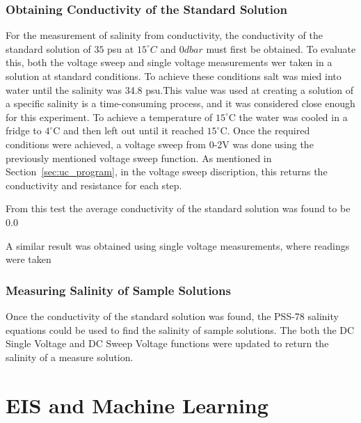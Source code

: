 \subsubsection{Obtaining Conductivity of the Standard Solution}
For the measurement of salinity from conductivity, the conductivity of the standard solution of $35$ \gls{psu} at $15^{\circ}C$ and $0dbar$ must first be obtained.
To evaluate this, both the voltage sweep and single voltage measurements wer taken in a solution at standard conditions.
To achieve these conditions salt was mied into water until the salinity was 34.8 \gls{psu}.This value was used at creating a solution of a specific salinity is a time-consuming process, and it was considered close enough for this experiment.
To achieve a temperature of $15^\circ$C the water was cooled in a fridge to $4^\circ$C and then left out until it reached $15^\circ$C.
Once the required conditions were achieved, a voltage sweep from 0-2V was done using the previously mentioned voltage sweep function.
As mentioned in Section~\ref{sec:uc_program}, in the voltage sweep discription, this returns the conductivity and resistance for each step.

From this test the average conductivity of the standard solution was found to be 0.0

A similar result was obtained using single voltage measurements, where readings were taken 

\subsubsection{Measuring Salinity of Sample Solutions}
Once the conductivity of the standard solution was found, the PSS-78 salinity equations could be used to find the salinity of sample solutions.
The both the DC Single Voltage and DC Sweep Voltage functions were updated to return the salinity of a measure solution.



\section{EIS and Machine Learning}



